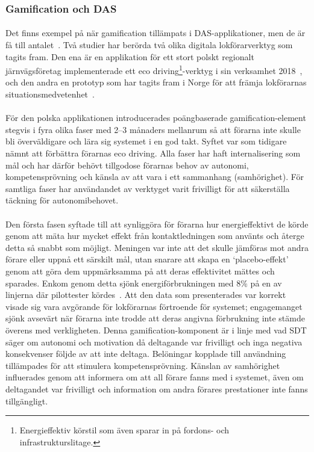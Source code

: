\subsubsection{Gamification och DAS}
\paragraph{}
\hspace{-11}Det finns exempel på när gamification tillämpats i DAS-applikationer, men de är få till antalet~\cite{Bae2014, Cwil2018}.
Två studier har berörda två olika digitala lokförarverktyg som tagits fram.
Den ena är en applikation för ett stort polskt regionalt järnvägsföretag implementerade ett eco driving\footnote{Energieffektiv körstil som även sparar in på fordons- och infrastrukturslitage.}-verktyg i sin verksamhet 2018~\cite{Cwil2018}, och den andra en prototyp som har tagits fram i Norge för att främja lokförarnas situationsmedvetenhet~\cite{Bae2014}.
\paragraph{}
\hspace{-11}För den polska applikationen introducerades poängbaserade gamification-element stegvis i fyra olika faser med 2--3 månaders mellanrum så att förarna inte skulle bli överväldigare och lära sig systemet i en god takt.
Syftet var som tidigare nämnt att förbättra förarnas eco driving.
Alla faser har haft internalisering som mål och har därför behövt tillgodose förarnas behov av autonomi, kompetensprövning och känsla av att vara i ett sammanhang (samhörighet).
För samtliga faser har användandet av verktyget varit frivilligt för att säkerställa täckning för autonomibehovet.
\paragraph{}
\hspace{-11}Den första fasen syftade till att synliggöra för förarna hur energieffektivt de körde genom att mäta hur mycket effekt från kontaktledningen som använts och återge detta så snabbt som möjligt.
Meningen var inte att det skulle jämföras mot andra förare eller uppnå ett särskilt mål, utan snarare att skapa en \lq{}placebo-effekt\rq{} genom att göra dem uppmärksamma på att deras effektivitet mättes och sparades.
Enkom genom detta sjönk energiförbrukningen med 8\% på en av linjerna där pilottester kördes~\cite{Cwil2018}.
Att den data som presenterades var korrekt visade sig vara avgörande för lokförarnas förtroende för systemet; engagemanget sjönk avsevärt när förarna inte trodde att deras angivna förbrukning inte stämde överens med verkligheten.
Denna gamification-komponent är i linje med vad SDT säger om autonomi och motivation då deltagande var frivilligt och inga negativa konsekvenser följde av att inte deltaga.
Belöningar kopplade till användning tillämpades för att stimulera kompetensprövning.
Känslan av samhörighet influerades genom att informera om att all förare fanns med i systemet, även om deltagandet var frivilligt och information om andra förares prestationer inte fanns tillgängligt.

